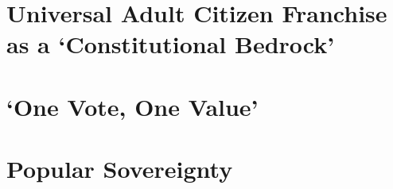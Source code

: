 \section{Universal Adult Citizen Franchise as a `Constitutional Bedrock'}

\section{`One Vote, One Value'}

\section{Popular Sovereignty}